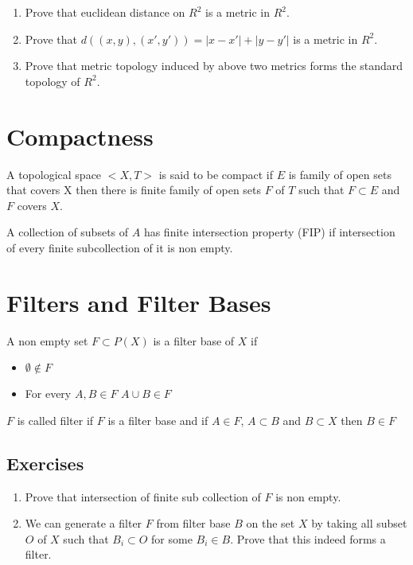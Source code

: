 \documentclass[twosides, openany]{tufte-book}
\begin{document}
\begin{enumerate}
    \item Prove that euclidean distance on $R^2$ is a metric in $R^2$.
    \item Prove that $d((x, y), (x', y')) = |x - x'| + |y - y'|$ is a metric in $R^2$.
    \item Prove that metric topology induced by above two metrics forms the standard topology of $R^2$.
\end{enumerate}

\chapter{Compactness}
A topological space $<X, T>$ is said to be compact if $E$ is family of open sets that covers X then there is finite family of open sets $F$ of $T$ such that $F \subset E$ and $F$ covers $X$. 

A collection of subsets of $A$ has finite intersection property (FIP) if intersection of every finite subcollection of it is non empty.

\chapter{Filters and Filter Bases}

A non empty set $F \subset P(X)$ is a filter base of $X$ if 
\begin{itemize}
    \item $\emptyset \notin F$
    \item For every $A, B \in F$ $A \cup B \in F$
\end{itemize}

$F$ is called filter if $F$ is a filter base and if $A \in F$, $A \subset B$ and $B \subset X$ then $B \in F$ 

\section{Exercises}
\begin{enumerate}
    \item Prove that intersection of finite sub collection of $F$ is non empty.
    \item We can generate a filter $F$ from filter base $B$ on the set $X$ by taking all subset $O$ of $X$ such that $B_i \subset O$ for some $B_i \in B$. Prove that this indeed forms a filter.
\end{enumerate}
\end{document}
